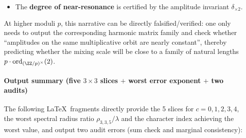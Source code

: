 \begin{remark}
\begin{itemize}
  \item The \textbf{degree of near-resonance} is certified by the amplitude invariant \(\delta_{\times 2}\).
\end{itemize}
At higher moduli \(p\), this narrative can be directly falsified/verified: one only needs to output the corresponding harmonic matrix family and check whether ``amplitudes on the same multiplicative orbit are nearly constant'', thereby predicting whether the mixing scale will be close to a family of natural lengths \(p\cdot \mathrm{ord}_{(\ZZ/p)^\times}(2)\).
\end{remark}

\paragraph{Output summary (five \texorpdfstring{$3\times 3$}{3x3} slices \texorpdfstring{$+$}{+} worst error exponent \texorpdfstring{$+$}{+} two audits)}
The following \LaTeX\ fragments directly provide the 5 slices for $c=0,1,2,3,4$, the worst spectral radius ratio $\rho_{3,3,5}/\lambda$ and the character index achieving the worst value, and output two audit errors (sum check and marginal consistency):
